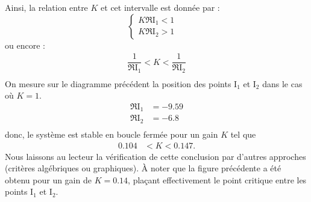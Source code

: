 Ainsi, la relation entre $K$ et cet intervalle est donnée par :
\[
\begin{cases}
    K\Re{\mathrm{I}_1} < 1 \\
    K\Re{\mathrm{I}_2} > 1 
\end{cases}\quad\textrm{}
\]
ou encore :
\begin{align*}
    \dfrac{1}{\Re{\mathrm{I}_1}}<K<\dfrac{1}{\Re{\mathrm{I}_2}} \\
\end{align*}
On mesure sur le diagramme précédent la position des points I$_1$ et I$_2$ 
dans le cas où $K=1$.
\begin{align*}
    \Re{\mathrm{I}_1}&=-9.59\\
    \Re{\mathrm{I}_2}&=-6.8\\
\end{align*}
donc, le système est stable en boucle fermée pour un gain $K$ tel que
\begin{align*}
    0.104&<K<0.147.
\end{align*}
Nous laissons au lecteur la vérification de cette conclusion par d'autres 
approches (critères algébriques ou graphiques).
À noter que la figure précédente a été obtenu pour un gain de $K=0.14$, plaçant
effectivement le point critique entre les points I$_1$ et I$_2$.
